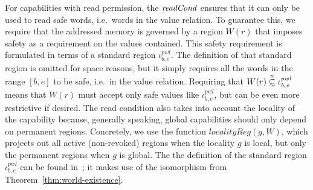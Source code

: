 \documentclass[format=acmsmall, review=false, screen=true]{acmart}
\newcommand\subsetsim{\mathrel{\ooalign{\raise.2ex\hbox{$\subset$}\cr
      \hidewidth\lower.8ex\hbox{\scalebox{0.9}{$\sim$}}\hidewidth\cr}}}
\newcommand{\nsubsim}[1][n]{\stackrel{\tiny{#1}}{\subsetsim}}
\newcommand{\var}[1]{\mathit{#1}}
\newcommand{\gl}{\var{g}}
\newcommand{\start}{\var{b}}
\newcommand{\addrend}{\var{e}}
\newcommand{\pwl}{\var{pwl}}
\newcommand{\plainfun}[2]{
  \ifthenelse{\equal{#2}{}}
  {\mathit{#1}}
  {\mathit{#1}(#2)}
}
\newcommand{\readCond}[1]{\plainfun{readCond}{#1}}
\begin{document}
For capabilities with read permission, the $\readCond{}$ ensures that it can
only be used to read safe words, i.e.\ words in the value relation. To guarantee
this, we require that the addressed memory is governed by a region $W(r)$ that
imposes safety as a requirement on the values contained. This safety requirement
is formulated in terms of a standard region $\iota^\pwl_{\start,\addrend}$. The
definition of that standard region is omitted for space reasons, but it simply
requires all the words in the range $[\start,\addrend]$ to be safe, i.e.\ in the
value relation. Requiring that $W(r)\nsubsim[n]\iota^\pwl_{\start,\addrend}$
means that $W(r)$ must accept only safe values like
$\iota^\pwl_{\start,\addrend}$, but can be even more restrictive if desired. The
read condition also takes into account the locality of the capability because,
generally speaking, global capabilities should only depend on permanent regions.
Concretely, we use the function $\var{localityReg}(\gl,W)$, which projects out
all active (non-revoked) regions when the locality $\gl$ is local, but only the
permanent regions when $\gl$ is global. The 
the definition of the standard region
$\iota^\pwl_{\start,\addrend}$ can be found
in~\citep{technical_appendix}; it makes use of the isomorphism from
Theorem~\ref{thm:world-existence}. 
\end{document}
